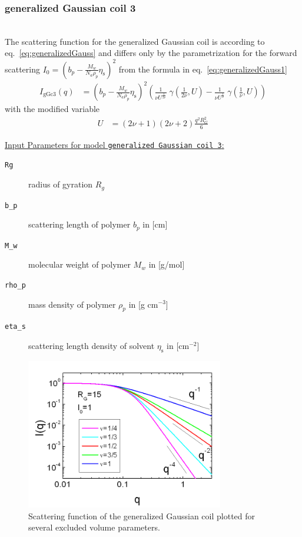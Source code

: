 \subsubsection{generalized Gaussian coil 3} \cite{Hammouda,Hammouda2012}
\label{sect:generalized_gaussian_coil3}
~\\
The scattering function for the generalized Gaussian coil is according to eq.\ \ref{eq:generalizedGauss}
and differs only by the parametrization for the forward scattering
$I_0=(b_p-\frac{M_w}{N_a\rho_p}\eta_\text{s})^2$ from the formula in eq.\ \ref{eq:generalizedGauss1}
\begin{align}
I_\text{gGc3}(q) &= \left(b_p-\frac{M_w}{N_a\rho_p}\eta_\text{s}\right)^2
\left(
\frac{1}{\nu U^{\frac{1}{2 \nu}}} \; \gamma\left(\frac{1}{2 \nu},U\right)-
\frac{1}{\nu U^{\frac{1}{  \nu}}} \; \gamma\left(\frac{1}{  \nu},U\right)
\right)
\label{eq:generalizedGauss3}
\end{align}
with the modified variable
\begin{align}
U&= \left(2\nu+1\right)\left(2\nu+2\right)\frac{q^2R_G^2}{6}
\end{align}

\vspace{5mm}
\uline{Input Parameters for model \texttt{generalized Gaussian coil 3}:}
\begin{description}
\item[\texttt{Rg}] radius of gyration $R_g$
\item[\texttt{b\_p}] scattering length of polymer $b_p$ in [cm]
\item[\texttt{M\_w}] molecular weight of polymer $M_w$ in [g/mol]
\item[\texttt{rho\_p}] mass density of polymer $\rho_p$ in [g cm$^{-3}$]
\item[\texttt{eta\_s}] scattering length density of solvent $\eta_\text{s}$ in [cm$^{-2}$]
\end{description}
\vspace{5mm}

\begin{figure}[htb]
\begin{center}
\includegraphics[width=0.768\textwidth,height=0.588\textwidth]{generalized_gaussian_coils.png}
\end{center}
\caption{Scattering function of the generalized Gaussian coil plotted for several excluded volume parameters.}
\label{fig:I_generalized_gaussian_coils}
\end{figure}

